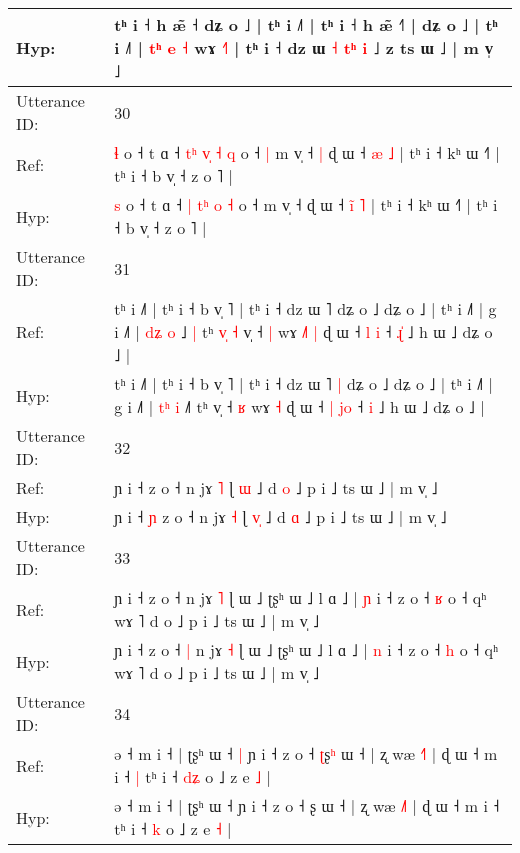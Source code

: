 \documentclass[10pt]{article}
\DeclareRobustCommand{\hl}[1]{{\textcolor{red}{#1}}}
\begin{document}
\begin{longtable}{ll}
Hyp: & tʰ i ˧ h æ̃ ˧\hl{}\hl{}\hl{} dʑ o ˩ | tʰ i ˩˥ | tʰ i ˧ h æ̃ ˧˥ | dʑ o ˩ | tʰ i ˩˥ |\hl{ }\hl{t}\hl{ʰ}\hl{ }\hl{e}\hl{ }\hl{˧} wɤ \hl{˧}˥ | tʰ i ˧ dz ɯ \hl{˧} \hl{t}\hl{ʰ} \hl{i} ˩ z\hl{}\hl{}\hl{}\hl{} ts ɯ ˩ | m v̩ ˩\hl{}\hl{}
 \\
\midrule
Utterance ID: & 30 \\
Ref: & \hl{ɬ} o ˧ t ɑ ˧ \hl{t}\hl{ʰ} \hl{v}\hl{̩} \hl{˧} \hl{q} o ˧\hl{ }\hl{|} m v̩ ˧\hl{ }\hl{|} ɖ ɯ ˧ \hl{}\hl{æ} \hl{˩} | tʰ i ˧ kʰ ɯ ˧˥ | tʰ i ˧ b v̩ ˧ z o ˥ |
 \\
Hyp: & \hl{s} o ˧ t ɑ ˧ \hl{}\hl{|} \hl{t}\hl{ʰ} \hl{o} \hl{˧} o ˧\hl{}\hl{} m v̩ ˧\hl{}\hl{} ɖ ɯ ˧ \hl{i}\hl{̃} \hl{˥} | tʰ i ˧ kʰ ɯ ˧˥ | tʰ i ˧ b v̩ ˧ z o ˥ |
 \\
\midrule
Utterance ID: & 31 \\
Ref: & tʰ i ˩˥ | tʰ i ˧ b v̩ ˥ | tʰ i ˧ dz ɯ ˥\hl{}\hl{} dʑ o ˩ dʑ o ˩ | tʰ i ˩˥ | g i ˩˥ | \hl{d}\hl{ʑ} \hl{o} ˩\hl{ }\hl{|} tʰ\hl{ }\hl{v}\hl{̩}\hl{ }\hl{˧} v̩ ˧ \hl{|} wɤ\hl{ }\hl{˩}\hl{˥} \hl{|} ɖ ɯ ˧ \hl{l} \hl{}\hl{i} ˧ \hl{ɻ}\hl{̍} ˩ h ɯ ˩ dʑ o ˩ |
 \\
Hyp: & tʰ i ˩˥ | tʰ i ˧ b v̩ ˥ | tʰ i ˧ dz ɯ ˥\hl{ }\hl{|} dʑ o ˩ dʑ o ˩ | tʰ i ˩˥ | g i ˩˥ | \hl{t}\hl{ʰ} \hl{i} ˩\hl{}\hl{˥} tʰ\hl{}\hl{}\hl{}\hl{}\hl{} v̩ ˧ \hl{ʁ} wɤ\hl{}\hl{}\hl{} \hl{˧} ɖ ɯ ˧ \hl{|} \hl{j}\hl{o} ˧ \hl{}\hl{i} ˩ h ɯ ˩ dʑ o ˩ |
 \\
\midrule
Utterance ID: & 32 \\
Ref: & ɲ i ˧\hl{}\hl{} z o ˧ n jɤ \hl{˥} ɭ \hl{}\hl{ɯ} ˩ d \hl{o} ˩ p i ˩ ts ɯ ˩ | m v̩ ˩
 \\
Hyp: & ɲ i ˧\hl{ }\hl{ɲ} z o ˧ n jɤ \hl{˧} ɭ \hl{v}\hl{̩} ˩ d \hl{ɑ} ˩ p i ˩ ts ɯ ˩ | m v̩ ˩
 \\
\midrule
Utterance ID: & 33 \\
Ref: & ɲ i ˧ z o ˧\hl{}\hl{} n jɤ \hl{˥} ɭ ɯ ˩ ʈʂʰ ɯ ˩ l ɑ ˩ | \hl{ɲ} i ˧ z o ˧ \hl{ʁ} o ˧ qʰ wɤ ˥ d o ˩ p i ˩ ts ɯ ˩ | m v̩ ˩
 \\
Hyp: & ɲ i ˧ z o ˧\hl{ }\hl{|} n jɤ \hl{˧} ɭ ɯ ˩ ʈʂʰ ɯ ˩ l ɑ ˩ | \hl{n} i ˧ z o ˧ \hl{h} o ˧ qʰ wɤ ˥ d o ˩ p i ˩ ts ɯ ˩ | m v̩ ˩
 \\
\midrule
Utterance ID: & 34 \\
Ref: & ə ˧ m i ˧ | ʈʂʰ ɯ ˧\hl{ }\hl{|} ɲ i ˧ z o ˧ \hl{ʈ}ʂ\hl{ʰ} ɯ ˧ | ʐ wæ \hl{˧}˥ | ɖ ɯ ˧ m i ˧\hl{ }\hl{|} tʰ i ˧ \hl{d}\hl{ʑ} o ˩ z e \hl{˩} |
 \\
Hyp: & ə ˧ m i ˧ | ʈʂʰ ɯ ˧\hl{}\hl{} ɲ i ˧ z o ˧ \hl{}ʂ\hl{} ɯ ˧ | ʐ wæ \hl{˩}˥ | ɖ ɯ ˧ m i ˧\hl{}\hl{} tʰ i ˧ \hl{}\hl{k} o ˩ z e \hl{˧} |
 \\

\end{longtable}
\end{document}
